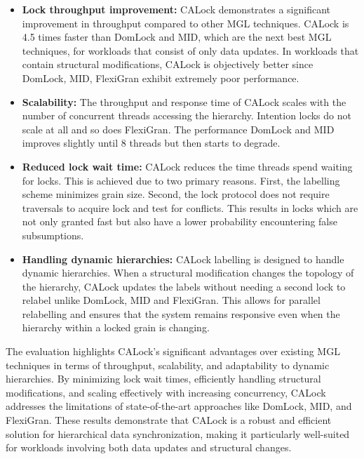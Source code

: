 \begin{itemize}
    \item \textbf{Lock throughput improvement:} CALock demonstrates a significant improvement in throughput compared to other MGL techniques. CALock is 4.5 times faster than DomLock and MID, which are the next best MGL techniques, for workloads that consist of only data updates. In workloads that contain structural modifications, CALock is objectively better since DomLock, MID, FlexiGran exhibit extremely poor performance. 

    \item \textbf{Scalability:} The throughput and response time of CALock scales with the number of concurrent threads accessing the hierarchy. Intention locks do not scale at all and so does FlexiGran. The performance DomLock and MID improves slightly until 8 threads but then starts to degrade. 
    
    \item \textbf{Reduced lock wait time:} CALock reduces the time threads spend waiting for locks. This is achieved due to two primary reasons. First, the labelling scheme minimizes grain size. Second, the lock protocol does not require traversals to acquire lock and test for conflicts. This results in locks which are not only granted fast but also have a lower probability encountering false subsumptions. 

    \item \textbf{Handling dynamic hierarchies:} CALock labelling is designed to handle dynamic hierarchies. When a structural modification changes the topology of the hierarchy, CALock updates the labels without needing a second lock to relabel unlike DomLock, MID and FlexiGran. This allows for parallel relabelling and ensures that the system remains responsive even when the hierarchy within a locked grain is changing.  
\end{itemize}


The evaluation highlights CALock's significant advantages over existing MGL techniques in terms of throughput, scalability, and adaptability to dynamic hierarchies. By minimizing lock wait times, efficiently handling structural modifications, and scaling effectively with increasing concurrency, CALock addresses the limitations of state-of-the-art approaches like DomLock, MID, and FlexiGran. These results demonstrate that CALock is a robust and efficient solution for hierarchical data synchronization, making it particularly well-suited for workloads involving both data updates and structural changes.


